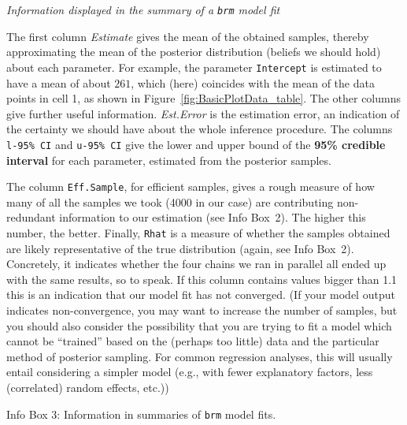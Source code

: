 \documentclass[nobib]{tufte-handout}
\begin{document}
\begin{InfoBox}[t]
\centering
\colorbox{mygray}{\centering
  \begin{minipage}{1.0\textwidth}

    \emph{Information displayed in the summary of a \texttt{brm} model fit}
    \medskip

    The first column \emph{Estimate} gives the mean of the obtained samples, thereby
    approximating the mean of the posterior distribution (beliefs we should hold) about each
    parameter. For example, the parameter \texttt{Intercept} is estimated to have a mean of
    about $261$, which (here) coincides with the mean of the data points in cell 1, as shown in
    Figure~\ref{fig:BasicPlotData_table}. The other columns give further useful information.
    \emph{Est.Error} is the estimation error, an indication of the certainty we should have
    about the whole inference procedure. The columns \texttt{l-95\% CI} and \texttt{u-95\% CI}
    give the lower and upper bound of the \textbf{95\% credible interval} for each parameter,
    estimated from the posterior samples.

    The column \texttt{Eff.Sample}, for efficient samples, gives a rough measure of how many of
    all the samples we took (4000 in our case) are contributing non-redundant information to
    our estimation (see Info Box~2). The higher this number, the better. Finally, \texttt{Rhat}
    is a measure of whether the samples obtained are likely representative of the true
    distribution (again, see Info Box~2). Concretely, it indicates whether the four chains we
    ran in parallel all ended up with the same results, so to speak. If this column contains
    values bigger than 1.1 this is an indication that our model fit has not converged. (If
    your model output indicates non-convergence, you may want to increase the number of
    samples, but you should also consider the possibility that you are trying to fit a model
    which cannot be ``trained'' based on the (perhaps too little) data and the particular
    method of posterior sampling. For common regression analyses, this will usually entail
    considering a simpler model (e.g., with fewer explanatory factors, less (correlated) random
    effects, etc.))
    
  \end{minipage} \par
  } \par
  \begin{center}
    Info Box 3: Information in summaries of \texttt{brm} model fits.
  \end{center}
\end{InfoBox}
\end{document}
